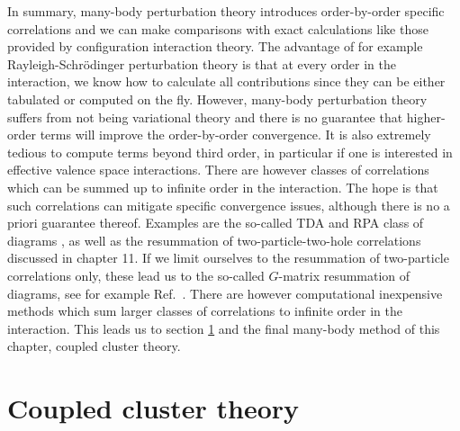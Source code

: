 In summary, many-body perturbation theory introduces order-by-order
specific correlations and we can make comparisons with exact
calculations like those provided by configuration interaction theory.
The advantage of for example Rayleigh-Schr\"odinger perturbation
theory is that at every order in the interaction, we know how to
calculate all contributions since they can be either tabulated or
computed on the fly.  However, many-body perturbation theory suffers
from not being variational theory and there is no guarantee that
higher-order terms will improve the order-by-order convergence.  It is
also extremely tedious to compute terms beyond third order, in
particular if one is interested in effective valence space
interactions.  There are however classes of correlations which can be
summed up to infinite order in the interaction.  The hope is that such
correlations can mitigate specific convergence issues, although there
is no a priori guarantee thereof.  Examples are the so-called TDA and
RPA class of diagrams \cite{ripkablaizot}, as well as the resummation
of two-particle-two-hole correlations discussed in chapter 11. If we limit ourselves to the
resummation of two-particle correlations only, these lead us to the
so-called $G$-matrix resummation of diagrams, see for example Ref.~\cite{day1967}.
There are however computational inexpensive methods which
sum larger classes of correlations to infinite order in the
interaction. This leads us to section \ref{sec:cctheory} and the final
many-body method of this chapter, coupled cluster theory. 


\section{Coupled cluster theory}\label{sec:cctheory}
  
